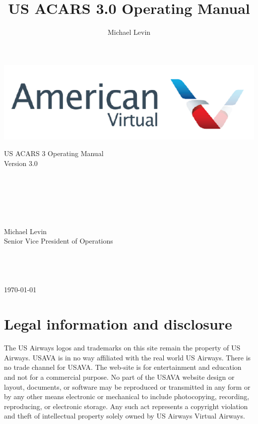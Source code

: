 \documentclass[12pt]{article}
\begin{document}
\title{US ACARS 3.0 Operating Manual}
\author{Michael Levin}

\includegraphics[scale=1]{Figure1.pdf}
\vspace*{\fill} 


\begin{center}
{\LARGE US ACARS 3 Operating Manual}\\
{\large Version 3.0}\\
\hfill \\ \hfill \\ \hfill \\ \hfill \\ \hfill \\ \hfill \\ 
{\Large Michael Levin}\\
Senior Vice President of Operations\\

\hfill \\ \hfill \\ \hfill \\ \hfill \\
\today
\end{center}

\vspace*{\fill} \newpage

\tableofcontents

\newpage

\section{Legal information and disclosure}
The US Airways logos and trademarks on this site remain the property of US Airways. USAVA is in no way affiliated with the real world US Airways. There is no trade channel for USAVA. The web-site is for entertainment and education and not for a commercial purpose. 
No part of the USAVA website design or layout, documents, or software may be reproduced or transmitted in any form or by any other means electronic or mechanical to include photocopying, recording, reproducing, or electronic storage. Any such act represents a copyright violation and theft of intellectual property solely owned by US Airways Virtual Airways.
\end{document}
